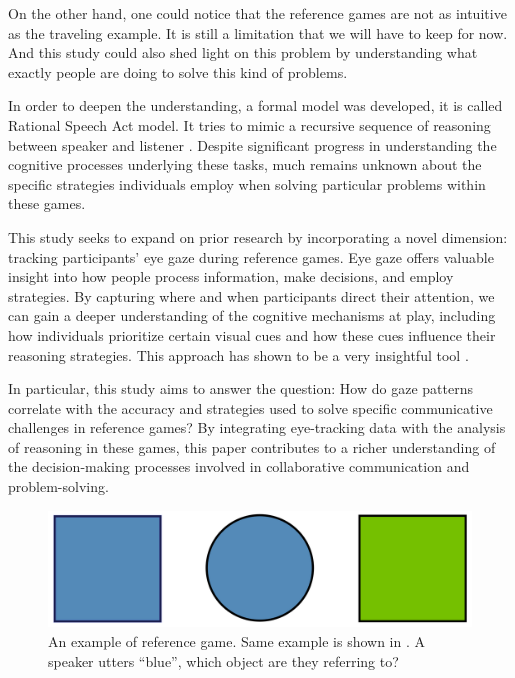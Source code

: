 On the other hand, one could notice that the reference games are not as intuitive as the traveling example. It is still a limitation that we will have to keep for now. And this study could also shed light on this problem by understanding what exactly people are doing to solve this kind of problems.

In order to deepen the understanding, a formal model was developed, it is called Rational Speech Act model. It tries to mimic a recursive sequence of reasoning between speaker and listener \citep{Franke_2016}. Despite significant progress in understanding the cognitive processes underlying these tasks, much remains unknown about the specific strategies individuals employ when solving particular problems within these games.

This study seeks to expand on prior research by incorporating a novel dimension: tracking participants' eye gaze during reference games. Eye gaze offers valuable insight into how people process information, make decisions, and employ strategies. By capturing where and when participants direct their attention, we can gain a deeper understanding of the cognitive mechanisms at play, including how individuals prioritize certain visual cues and how these cues influence their reasoning strategies. This approach has shown to be a very insightful tool \citep{Vigneau_2006}.

In particular, this study aims to answer the question: How do gaze patterns correlate with the accuracy and strategies used to solve specific communicative challenges in reference games? By integrating eye-tracking data with the analysis of reasoning in these games, this paper contributes to a richer understanding of the decision-making processes involved in collaborative communication and problem-solving.

\begin{figure}
    \centering
    \includegraphics[width=0.6\linewidth]{images/intro_complex.png}
    \caption{An example of reference game. Same example is shown in \cite{Frank_2012}. A speaker utters ``blue'', which object are they referring to?}
    \label{fig:intro_complex}
\end{figure}